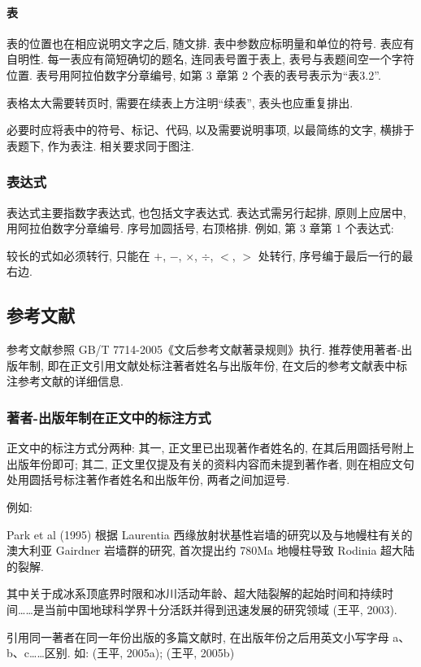 \paragraph{表}
表的位置也在相应说明文字之后, 随文排. 表中参数应标明量和单位的符号. 表应有自明性. 每一表应有简短确切的题名, 连同表号置于表上, 表号与表题间空一个字符位置. 表号用阿拉伯数字分章编号, 如第 3 章第 2 个表的表号表示为“表3.2”.

表格太大需要转页时, 需要在续表上方注明“续表”, 表头也应重复排出.

必要时应将表中的符号、标记、代码, 以及需要说明事项, 以最简练的文字, 横排于表题下, 作为表注. 相关要求同于图注.

\subsubsection{表达式}

表达式主要指数字表达式, 也包括文字表达式. 表达式需另行起排, 原则上应居中, 用阿拉伯数字分章编号. 序号加圆括号, 右顶格排. 例如, 第 3 章第 1 个表达式:

较长的式如必须转行, 只能在 $+$, $-$, $\times$, $\div$, $<$, $>$ 处转行, 序号编于最后一行的最右边.

\subsection{参考文献}

参考文献参照 GB/T 7714-2005《文后参考文献著录规则》执行. 推荐使用著者-出版年制, 即在正文引用文献处标注著者姓名与出版年份, 在文后的参考文献表中标注参考文献的详细信息.

\subsubsection{著者-出版年制在正文中的标注方式}

正文中的标注方式分两种: 其一, 正文里已出现著作者姓名的, 在其后用圆括号附上出版年份即可; 其二, 正文里仅提及有关的资料内容而未提到著作者, 则在相应文句处用圆括号标注著作者姓名和出版年份, 两者之间加逗号.

例如:

Park et al (1995) 根据 Laurentia 西缘放射状基性岩墙的研究以及与地幔柱有关的澳大利亚 Gairdner 岩墙群的研究, 首次提出约 780Ma 地幔柱导致 Rodinia 超大陆的裂解.

其中关于成冰系顶底界时限和冰川活动年龄、超大陆裂解的起始时间和持续时间……是当前中国地球科学界十分活跃并得到迅速发展的研究领域 (王平, 2003).

引用同一著者在同一年份出版的多篇文献时, 在出版年份之后用英文小写字母 a、b、c……区别. 如: (王平, 2005a); (王平, 2005b)

